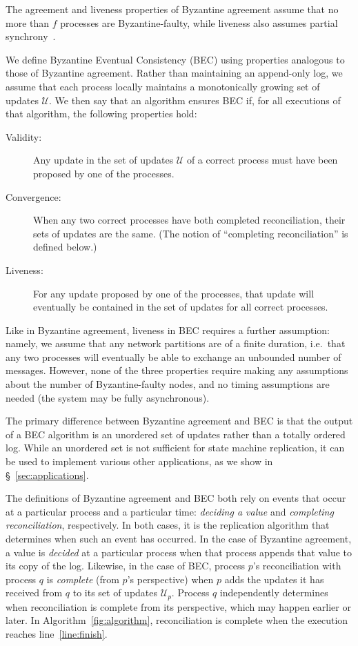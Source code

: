 \documentclass[a4paper,anonymous,USenglish]{lipics-v2019}
\begin{document}
The agreement and liveness properties of Byzantine agreement assume that no more than $f$ processes are Byzantine-faulty, while liveness also assumes partial synchrony~\cite{Dwork:1988}.

We define Byzantine Eventual Consistency (BEC) using properties analogous to those of Byzantine agreement.
Rather than maintaining an append-only log, we assume that each process locally maintains a monotonically growing set of updates $\mathcal{U}$.
We then say that an algorithm ensures BEC if, for all executions of that algorithm, the following properties hold:

\begin{description}
\item[Validity:] Any update in the set of updates $\mathcal{U}$ of a correct process must have been proposed by one of the processes.
\item[Convergence:] When any two correct processes have both completed reconciliation, their sets of updates are the same. (The notion of ``completing reconciliation'' is defined below.)
\item[Liveness:] For any update proposed by one of the processes, that update will eventually be contained in the set of updates for all correct processes.
\end{description}

Like in Byzantine agreement, liveness in BEC requires a further assumption: namely, we assume that any network partitions are of a finite duration, i.e.\ that any two processes will eventually be able to exchange an unbounded number of messages.
However, none of the three properties require making any assumptions about the number of Byzantine-faulty nodes, and no timing assumptions are needed (the system may be fully asynchronous).

The primary difference between Byzantine agreement and BEC is that the output of a BEC algorithm is an unordered set of updates rather than a totally ordered log.
While an unordered set is not sufficient for state machine replication, it can be used to implement various other applications, as we show in \S~\ref{sec:applications}.

The definitions of Byzantine agreement and BEC both rely on events that occur at a particular process and a particular time: \emph{deciding a value} and \emph{completing reconciliation}, respectively.
In both cases, it is the replication algorithm that determines when such an event has occurred.
In the case of Byzantine agreement, a value is \emph{decided} at a particular process when that process appends that value to its copy of the log.
Likewise, in the case of BEC, process $p$'s reconciliation with process $q$ is \emph{complete} (from $p$'s perspective) when $p$ adds the updates it has received from $q$ to its set of updates $\mathcal{U}_p$.
Process $q$ independently determines when reconciliation is complete from its perspective, which may happen earlier or later.
In Algorithm~\ref{fig:algorithm}, reconciliation is complete when the execution reaches line~\ref{line:finish}.
\end{document}
